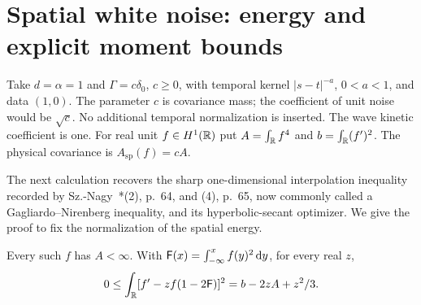 \section{Spatial white noise: energy and explicit moment bounds}
\label{S:intrinsic-white-evaluation}

Take $d = \alpha = 1$ and $\Gamma = c\delta_0$, $c \ge 0$, with temporal kernel
$|s-t|^{-a}$, $0 < a < 1$, and data $(1,0)$. The parameter $c$ is covariance
mass; the coefficient of unit noise would be $\sqrt c$. No additional temporal
normalization is inserted. The wave kinetic coefficient is one. For real unit $f
\in H^1(\mathbb{R})$ put $A = \int_{\mathbb{R}} f^4$ and $b = \int_{\mathbb{R}}(f')^2$. The physical
covariance is $A_{\mathrm{sp}}(f) = cA$.

The next calculation recovers the sharp one-dimensional interpolation
inequality recorded by Sz.-Nagy~\cite{sz.nagy:source1941:integralungleichungen}*{(2),
p.~64, and (4), p.~65}, now commonly called a Gagliardo--Nirenberg inequality,
and its hyperbolic-secant optimizer. We give the proof to fix the normalization
of the spatial energy.

\begin{lemma}\label{L:white-cdf-square}
  Every such $f$ has $A < \infty$. With $\mathsf{F}(x) =
  \int_{-\infty}^xf(y)^2\,\mathrm{d} y$, for every real $z$,
  \begin{equation}\label{E:white-cdf-square}
    0\le\int_{\mathbb{R}}[f'-zf(1-2\mathsf{F})]^2
    =b-2zA+z^2/3 .
  \end{equation}
\end{lemma}

